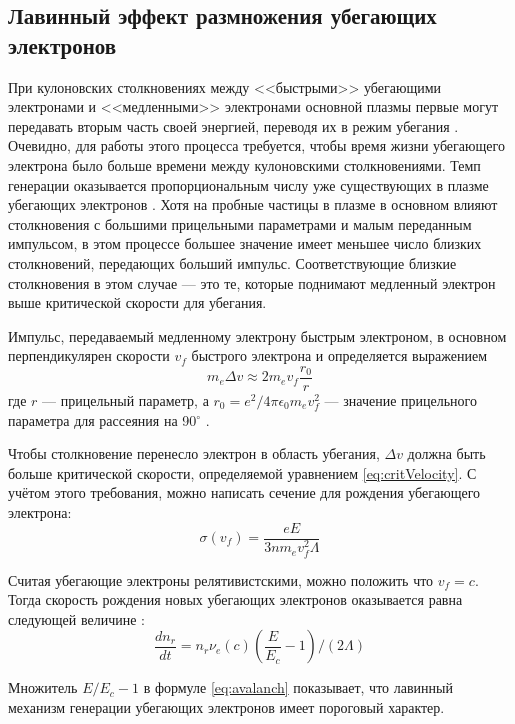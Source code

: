 \subsection{Лавинный эффект размножения убегающих электронов}

При кулоновских столкновениях между <<быстрыми>> убегающими электронами и <<медленными>> электронами основной плазмы первые могут передавать вторым часть своей энергией, переводя их в режим убегания \cite{Sokolov1979}. Очевидно, для работы этого процесса требуется, чтобы время жизни убегающего электрона было больше времени между кулоновскими столкновениями. Темп генерации оказывается пропорциональным числу уже существующих в плазме убегающих электронов \cite{Rozansky2012}.  Хотя на пробные частицы в плазме в основном влияют столкновения с большими прицельными параметрами и малым переданным импульсом, в этом процессе большее значение имеет меньшее число близких столкновений, передающих больший импульс. Соответствующие близкие столкновения в этом случае --- это те, которые поднимают медленный электрон выше критической скорости для убегания. 

Импульс, передаваемый медленному электрону быстрым электроном, в основном перпендикулярен скорости $v_f$ быстрого электрона и определяется выражением
\begin{equation*}
  m_e \Delta v \approx 2 m_e v_f \frac{r_0}{r}
\end{equation*}
где $r$ --- прицельный параметр, а $r_0 = e^2 / 4 \pi \epsilon_0 m_e v_f^2$ --- значение прицельного параметра для рассеяния на 90$^\circ$ \cite{Wesson2004}. 

Чтобы столкновение перенесло электрон в область убегания, $\Delta v$ должна быть больше критической скорости, определяемой уравнением \ref{eq:critVelocity}. С учётом этого требования, можно написать сечение для рождения убегающего электрона:
\begin{equation*}
  \sigma(v_f) = \frac{ e E }{ 3 n m_e v_f^2 \Lambda }
\end{equation*}

Считая убегающие электроны релятивистскими, можно положить что $v_f = c$. Тогда скорость рождения новых убегающих электронов оказывается равна следующей величине \cite{Rozansky2012}:
\begin{equation}
  \label{eq:avalanch}
  \frac{ d n_r }{ d t } = n_r \nu_e(c) \left( \frac{E}{E_c} - 1 \right) / \left( 2 \Lambda \right)
\end{equation}

Множитель $E/E_c - 1 $ в формуле \ref{eq:avalanch} показывает, что лавинный механизм генерации убегающих электронов имеет пороговый характер.

